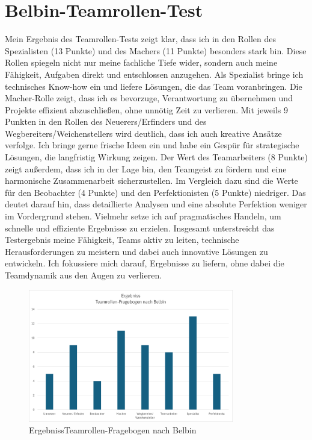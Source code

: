 \section{Belbin-Teamrollen-Test}
Mein Ergebnis des Teamrollen-Tests zeigt klar, dass ich in den Rollen des Spezialisten (13 Punkte) und des Machers (11 Punkte) besonders stark bin. Diese Rollen spiegeln nicht nur meine fachliche Tiefe wider, sondern auch meine Fähigkeit, Aufgaben direkt und entschlossen anzugehen. Als Spezialist bringe ich technisches Know-how ein und liefere Lösungen, die das Team voranbringen. Die Macher-Rolle zeigt, dass ich es bevorzuge, Verantwortung zu übernehmen und Projekte effizient abzuschließen, ohne unnötig Zeit zu verlieren.
Mit jeweils 9 Punkten in den Rollen des Neuerers/Erfinders und des Wegbereiters/Weichenstellers wird deutlich, dass ich auch kreative Ansätze verfolge. Ich bringe gerne frische Ideen ein und habe ein Gespür für strategische Lösungen, die langfristig Wirkung zeigen. Der Wert des Teamarbeiters (8 Punkte) zeigt außerdem, dass ich in der Lage bin, den Teamgeist zu fördern und eine harmonische Zusammenarbeit sicherzustellen.
Im Vergleich dazu sind die Werte für den Beobachter (4 Punkte) und den Perfektionisten (5 Punkte) niedriger. Das deutet darauf hin, dass detaillierte Analysen und eine absolute Perfektion weniger im Vordergrund stehen. Vielmehr setze ich auf pragmatisches Handeln, um schnelle und effiziente Ergebnisse zu erzielen.
Insgesamt unterstreicht das Testergebnis meine Fähigkeit, Teams aktiv zu leiten, technische Herausforderungen zu meistern und dabei auch innovative Lösungen zu entwickeln. Ich fokussiere mich darauf, Ergebnisse zu liefern, ohne dabei die Teamdynamik aus den Augen zu verlieren.

\begin{figure}[H]
	\begin{center}
		\includegraphics[width=0.8\textwidth]{Pictures/ErgebnisBelbin.png}
    \end{center}
	\caption[ErgebnissTeamrollen-Fragebogen nach Belbin]{ErgebnissTeamrollen-Fragebogen nach Belbin}
	\label{fig:ErgebnisBelbin}
\end{figure}

\newpage
